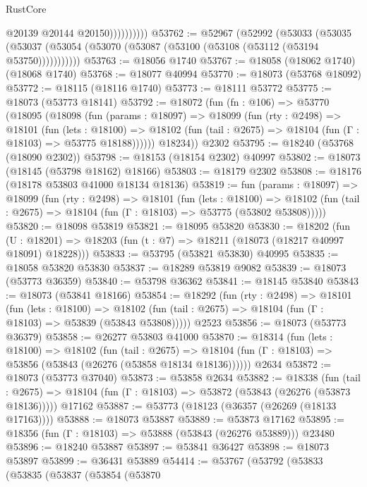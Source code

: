 \begin{lexlean}{RustCore}
\begin{coremodule}
                        @20139
                        @20144
                        @20150))))))))))
@53762 := @52967
    (@52992
      (@53033
        (@53035 (@53037 (@53054 (@53070 (@53087 (@53100 (@53108 (@53112 (@53194 @53750)))))))))))
@53763 := @18056 @1740
@53767 := @18058 (@18062 @1740) (@18068 @1740)
@53768 := @18077 @40994
@53770 := @18073 (@53768 @18092)
@53772 := @18115 (@18116 @1740)
@53773 := @18111 @53772
@53775 := @18073 (@53773 @18141)
@53792 := @18072
    (fun (fn : @106) =>
    @53770
      (@18095
        (@18098
          (fun (params : @18097) =>
          @18099
            (fun (rty : @2498) =>
            @18101
              (fun (lets : @18100) =>
              @18102 (fun (tail : @2675) => @18104 (fun (Γ : @18103) => @53775 @18188))))))
        @18234))
    @2302
@53795 := @18240 (@53768 (@18090 @2302))
@53798 := @18153 (@18154 @2302) @40997
@53802 := @18073 (@18145 (@53798 @18162) @18166)
@53803 := @18179 @2302
@53808 := @18176 (@18178 @53803 @41000 @18134 @18136)
@53819 := fun (params : @18097) =>
  @18099
    (fun (rty : @2498) =>
    @18101
      (fun (lets : @18100) =>
      @18102 (fun (tail : @2675) => @18104 (fun (Γ : @18103) => @53775 (@53802 @53808)))))
@53820 := @18098 @53819
@53821 := @18095 @53820
@53830 := @18202
    (fun (U : @18201) => @18203 (fun (t : @7) => @18211 (@18073 (@18217 @40997 @18091) @18228)))
@53833 := @53795 (@53821 @53830) @40995
@53835 := @18058 @53820 @53830
@53837 := @18289 @53819 @9082
@53839 := @18073 (@53773 @36359)
@53840 := @53798 @36362
@53841 := @18145 @53840
@53843 := @18073 (@53841 @18166)
@53854 := @18292
    (fun (rty : @2498) =>
    @18101
      (fun (lets : @18100) =>
      @18102 (fun (tail : @2675) => @18104 (fun (Γ : @18103) => @53839 (@53843 @53808)))))
    @2523
@53856 := @18073 (@53773 @36379)
@53858 := @26277 @53803 @41000
@53870 := @18314
    (fun (lets : @18100) =>
    @18102
      (fun (tail : @2675) =>
      @18104 (fun (Γ : @18103) => @53856 (@53843 (@26276 (@53858 @18134 @18136))))))
    @2634
@53872 := @18073 (@53773 @37040)
@53873 := @53858 @2634
@53882 := @18338
    (fun (tail : @2675) => @18104 (fun (Γ : @18103) => @53872 (@53843 (@26276 (@53873 @18136)))))
    @17162
@53887 := @53773 (@18123 (@36357 (@26269 (@18133 @17163))))
@53888 := @18073 @53887
@53889 := @53873 @17162
@53895 := @18356 (fun (Γ : @18103) => @53888 (@53843 (@26276 @53889))) @23480
@53896 := @18240 @53887
@53897 := @53841 @36427
@53898 := @18073 @53897
@53899 := @36431 @53889
@54414 := @53767
    (@53792
      (@53833
        (@53835
          (@53837
            (@53854
              (@53870

\end{coremodule}
\end{lexlean}

